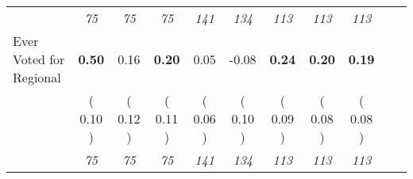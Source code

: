 \begin{tabular}{l c c c c c c c c c c}
& \textit{ 75 } & \textit{ 75 } & \textit{ 75 } & \textit{ 141 } & \textit{ 134 } & \textit{ 113 } & \textit{ 113 } & \textit{ 113 } \\
Ever Voted for Regional & \textbf{      0.50 } &      0.16 & \textbf{      0.20 } &      0.05 &     -0.08 & \textbf{      0.24 } & \textbf{      0.20 } & \textbf{      0.19 } \\
& (     0.10 ) & (     0.12 ) & (     0.11 ) & (     0.06 ) & (     0.10 ) & (     0.09 ) & (     0.08 ) & (     0.08 ) \\
& \textit{ 75 } & \textit{ 75 } & \textit{ 75 } & \textit{ 141 } & \textit{ 134 } & \textit{ 113 } & \textit{ 113 } & \textit{ 113 } \\
\bottomrule
\end{tabular}

